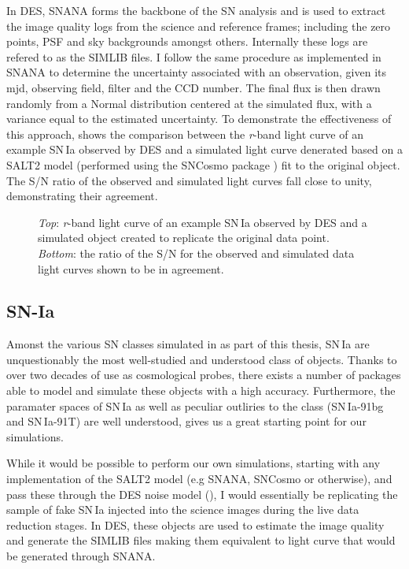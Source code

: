 In DES, SNANA forms the backbone of the SN analysis and is used to extract the image quality logs from the science and reference frames; including the zero points, PSF and sky backgrounds amongst others. Internally these logs are refered to as the \textsc{SIMLIB} files. I follow the same procedure as implemented in SNANA to determine the uncertainty associated with an observation, given its mjd, observing field, filter and the CCD number. The final flux is then drawn randomly from a Normal distribution centered at the simulated flux, with a variance equal to the estimated uncertainty. To demonstrate the effectiveness of this approach,  shows the comparison between the \textit{r}-band light curve of an example SN\,Ia observed by DES and a simulated light curve denerated based on a SALT2 model (performed using the SNCosmo package \citep{Barbary2014}) fit to the original object. The S/N ratio of the observed and simulated light curves fall close to unity, demonstrating their agreement.

\begin{figure}
  \caption{\textit{Top}: \textit{r}-band light curve of an example SN\,Ia observed by DES and a simulated object created to replicate the original data point. \textit{Bottom}: the ratio of the S/N for the observed and simulated data light curves shown to be in agreement.}
  \label{fig:IaNoiseComp}
\end{figure}

\subsection{SN-Ia}
Amonst the various SN classes simulated in as part of this thesis, SN\,Ia are unquestionably the most well-studied and understood class of objects. Thanks to over two decades of use as cosmological probes, there exists a number of packages able to model and simulate these objects with a high accuracy. Furthermore, the paramater spaces of SN\,Ia as well as peculiar outliries to the class (SN\,Ia-91bg and SN\,Ia-91T) are well understood, gives us a great starting point for our simulations.

While it would be possible to perform our own simulations, starting with any implementation of the SALT2 model (e.g SNANA, SNCosmo or otherwise), and pass these through the DES noise model (), I would essentially be replicating the sample of fake SN\,Ia injected into the science images during the live data reduction stages. In DES, these objects are used to estimate the image quality and generate the \textsc{SIMLIB} files making them equivalent to light curve that would be generated through SNANA.

